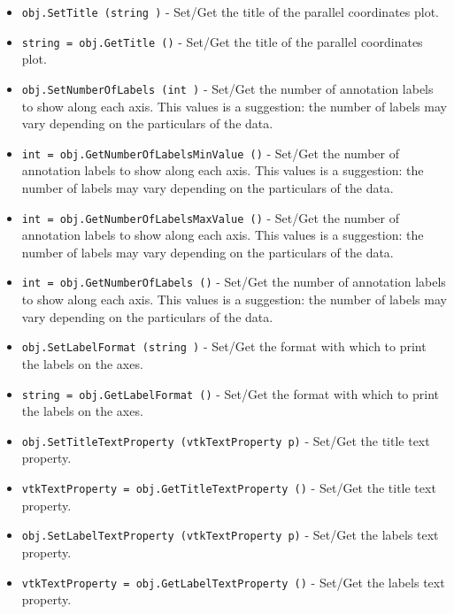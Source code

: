 \begin{itemize}
\item  \verb|obj.SetTitle (string )| -  Set/Get the title of the parallel coordinates plot.

\item  \verb|string = obj.GetTitle ()| -  Set/Get the title of the parallel coordinates plot.

\item  \verb|obj.SetNumberOfLabels (int )| -  Set/Get the number of annotation labels to show along each axis.
 This values is a suggestion: the number of labels may vary depending
 on the particulars of the data.

\item  \verb|int = obj.GetNumberOfLabelsMinValue ()| -  Set/Get the number of annotation labels to show along each axis.
 This values is a suggestion: the number of labels may vary depending
 on the particulars of the data.

\item  \verb|int = obj.GetNumberOfLabelsMaxValue ()| -  Set/Get the number of annotation labels to show along each axis.
 This values is a suggestion: the number of labels may vary depending
 on the particulars of the data.

\item  \verb|int = obj.GetNumberOfLabels ()| -  Set/Get the number of annotation labels to show along each axis.
 This values is a suggestion: the number of labels may vary depending
 on the particulars of the data.

\item  \verb|obj.SetLabelFormat (string )| -  Set/Get the format with which to print the labels on the axes.

\item  \verb|string = obj.GetLabelFormat ()| -  Set/Get the format with which to print the labels on the axes.

\item  \verb|obj.SetTitleTextProperty (vtkTextProperty p)| -  Set/Get the title text property.

\item  \verb|vtkTextProperty = obj.GetTitleTextProperty ()| -  Set/Get the title text property.

\item  \verb|obj.SetLabelTextProperty (vtkTextProperty p)| -  Set/Get the labels text property.

\item  \verb|vtkTextProperty = obj.GetLabelTextProperty ()| -  Set/Get the labels text property.


\end{itemize}
